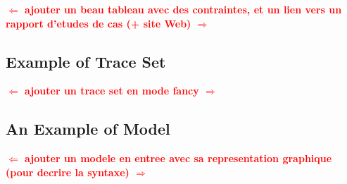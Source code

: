 \documentclass{llncs}
\newcommand{\commentaire}[1]{\textcolor{red}{\textbf{$\Leftarrow$  #1 $\Rightarrow$}}}
\begin{document}
\commentaire{ajouter un beau tableau avec des contraintes, et un lien vers un rapport d'etudes de cas (+ site Web)}

\subsection*{Example of Trace Set}

\commentaire{ajouter un trace set en mode fancy}

\subsection*{An Example of Model}

\commentaire{ajouter un modele en entree avec sa representation graphique (pour decrire la syntaxe)}
\end{document}
